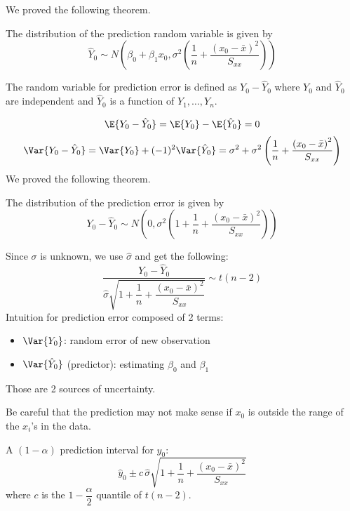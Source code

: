 We proved the following theorem.
\begin{theorem}
    The distribution of the prediction random variable is given by
    \[ \hat{Y}_0 \sim N\left( \beta_0+\beta_1x_0,
        \sigma^2\left( \frac{1}{n} +\frac{\left( x_0-\bar{x} \right)^2}{S_{xx}}  \right) \right) \]
\end{theorem}
\begin{definition}
    The random variable for prediction error is defined as
    $ Y_0-\hat{Y}_0 $
    where $ Y_0 $ and $ \hat{Y}_0 $ are independent
    and $ \hat{Y}_0 $ is a function of $ Y_1,\ldots,Y_n $.
\end{definition}
\[ \E{Y_0-\hat{Y}_0}=\E{Y_0}-\E{\hat{Y}_0}=0 \]
\[ \Var{Y_0-\hat{Y}_0}=\Var{Y_0}+(-1)^2\Var{\hat{Y}_0}
    =\sigma^2+\sigma^2\left( \frac{1}{n} +\frac{\left( x_0-\bar{x} \right)^2}{S_{xx}} \right)
\]
We proved the following theorem.
\begin{theorem}
    The distribution of the prediction error is given by
    \[ Y_0-\hat{Y}_0
        \sim N\left( 0,\sigma^2\left( 1+\frac{1}{n}+\frac{\left( x_0-\bar{x} \right)^2}{S_{xx}}  \right) \right) \]
\end{theorem}
Since $ \sigma $ is unknown, we use $ \hat{\sigma} $ and get the following:
\[ \frac{Y_0-\hat{Y}_0}{
        \hat{\sigma}\sqrt{1+\dfrac{1}{n}+\dfrac{(x_0-\bar{x})^2}{S_{xx}}}
    } \sim t(n-2) \]
Intuition for prediction error composed of 2 terms:
\begin{itemize}
    \item $ \Var{Y_0} $: random error of new observation
    \item $ \Var{\hat{Y}_0} $ (predictor): estimating $ \beta_0 $ and $ \beta_1 $
\end{itemize}
Those are 2 sources of uncertainty.

\begin{remark}
    Be careful that the prediction may not make sense if
    $ x_0 $ is outside the range of the $ x_i $'s in the data.
\end{remark}

A $ (1-\alpha) $ prediction interval for $ y_0 $:
\[ \hat{y}_0\pm c\, \hat{\sigma}\sqrt{1+\dfrac{1}{n}+\dfrac{(x_0-\bar{x})^2}{S_{xx}}}
\]
where $ c $ is the $ 1-\dfrac{\alpha}{2} $ quantile of $ t(n-2) $.

